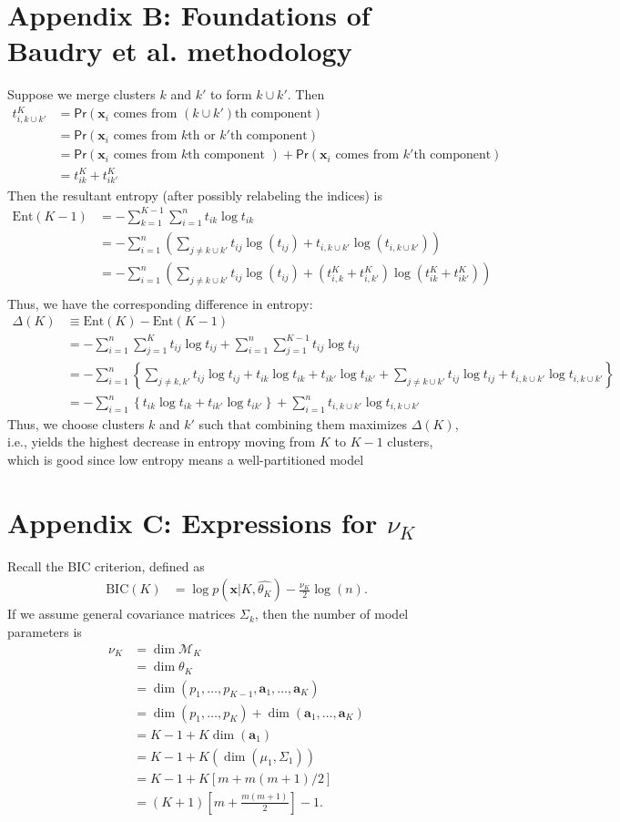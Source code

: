\documentclass[11pt]{article}
\newcommand*\ba{\[ \begin{aligned}}
\newcommand*\ea{\end{aligned} \]}
\newcommand*\estim[1]{\widehat{#1}}
\newcommand*\bolda{\mathbf{a}}
\newcommand*\bx{\mathbf{x}}
\renewcommand\;{\,}
\renewcommand\Pr[1]{ \mathsf{Pr}\left(#1\right) }
\begin{document}
\section*{Appendix B: Foundations of Baudry et al. methodology}
Suppose we merge clusters $k$ and $k'$ to form $k \cup k'$. Then
\ba
t_{i, k \cup k'}^K
	& = \Pr{\bx_i \text{ comes from $(k \cup k')$th component}} \\
	& = \Pr{\bx_i \text{ comes from $k$th or $k'$th component} } \\
	& = \Pr{\bx_i \text{ comes from $k$th component }} + \Pr{\bx_i \text{ comes from $k'$th component} } \\
	& = t_{ik}^K + t_{ik'}^K
\ea
Then the resultant entropy (after possibly relabeling the indices) is
\ba
\text{Ent}(K - 1) & = - \sum_{k=1}^{K - 1} \sum_{i=1}^n t_{ik} \log t_{ik} \\
	& = - \sum_{i=1}^n \left( \sum_{j \ne k \cup k'} t_{ij} \log(t_{ij}) + t_{i,k \cup k'} \log( t_{i,k\cup k'} ) \right) \\
	& = - \sum_{i=1}^n \left( \sum_{j \ne k \cup k'} t_{ij} \log(t_{ij}) + (t_{i,k}^K + t_{i,k'}^K) \log( t_{ik}^K + t_{ik'}^K) \right) \\
\ea
Thus, we have the corresponding difference in entropy:
\ba
\Delta(K) 
	& \equiv \text{Ent}(K) - \text{Ent}(K - 1) \\
	& = -  \sum_{i=1}^n \sum_{j=1}^K t_{ij} \log t_{ij} + \sum_{i=1}^n \sum_{j=1}^{K - 1} t_{ij} \log t_{ij} \\
	& = - \sum_{i=1}^n \left\{
			\sum_{j \ne k, k'} t_{ij} \log t_{ij}
			+ t_{ik} \log t_{ik} + t_{ik'} \log t_{ik'}
			+ \sum_{j \ne k \cup k'} t_{ij} \log t_{ij}
			+ t_{i, k\cup k'} \log t_{i, k \cup k'}
		\right\} \\
	& = - \sum_{i=1}^n \left\{ t_{ik} \log t_{ik} + t_{ik'} \log t_{ik'} \right\}
		+ \sum_{i=1}^n t_{i,k\cup k'} \log t_{i, k \cup k'}
\ea
Thus, we choose clusters $k$ and $k'$ such that combining them maximizes $\Delta(K)$, i.e., yields the highest decrease in entropy moving from $K$ to $K - 1$ clusters, which is good since low entropy means a well-partitioned model 

\section*{Appendix C: Expressions for $\nu_K$}
Recall the BIC criterion, defined as
\ba
\text{BIC}(K) 
	& = \log p(\bx | K, \estim{\theta_K})
		- \frac{\nu_K}{2} \log(n).
\ea
If we assume general covariance matrices $\Sigma_k$, then the number of model parameters is
\ba
\nu_K & = \dim \mathcal M_K \\
	& = \dim \theta_K \\
	& = \dim \left( p_1, \dotsc, p_{K - 1}, \bolda_1, \dotsc, \bolda_K \right) \\
	& = \dim \left( p_1, \dotsc, p_K \right)
		+ \dim \left( \bolda_1, \dotsc, \bolda_K \right) \\
	& = K - 1 + K \dim(\bolda_1) \\
	& = K - 1 + K \left(\dim\left(\mu_1, \Sigma_1 \right) \right) \\
	& = K - 1 + K \left[ m + m(m + 1)/2 \right] \\
	& = (K + 1)\left[ m + \frac{m(m + 1)}{2} \right] - 1. 
\ea 
\end{document}
